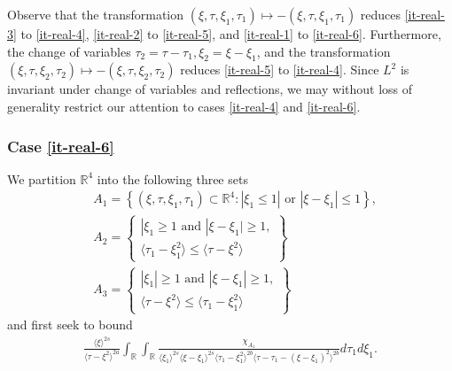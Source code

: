 \documentclass[12pt,reqno]{amsart}
\numberwithin{equation}{section}  %
\numberwithin{figure}{section}
\newcommand{\rr}{\mathbb{R}}
\theoremstyle{plain}
\theoremstyle{definition}
\theoremstyle{remark}
\begin{document}
%
%
Observe that the transformation $(\xi, \tau, \xi_{1}, \tau_{1}) \mapsto -(\xi, \tau,
\xi_{1}, \tau_{1})$ reduces \eqref{it-real-3} to \eqref{it-real-4}, \eqref{it-real-2} to
\eqref{it-real-5}, and \eqref{it-real-1} to \eqref{it-real-6}. Furthermore, the change of
variables $\tau_{2} = \tau - \tau_{1}, \xi_{2} = \xi - \xi_{1}$, and the
transformation $(\xi, \tau, \xi_{2}, \tau_{2}) \mapsto - (\xi, \tau, \xi_{2},
\tau_{2})$ reduces \eqref{it-real-5} to \eqref{it-real-4}. Since $L^{2}$ is invariant
under change of variables and reflections, we may without loss of generality
restrict our attention to cases \eqref{it-real-4} and \eqref{it-real-6}.
 \subsubsection{Case \eqref{it-real-6}} 
\label{sssec:case-it-real-6}
We partition $\rr^{4}$ into the following three sets 
%
%
\begin{equation*}
\begin{split}
  & A_{1} = \left\{ (\xi, \tau, \xi_{1}, \tau_{1}) \subset \rr^{4}: |
  \xi_{1} \le 1 | \text{ or } | \xi - \xi_{1} | \le 1 \right\},
  \\
  & A_{2} = 
  \begin{Bmatrix}
    | \xi_{1} \ge 1 \text{ and } | \xi - \xi_{1} | \ge 1,
    \\
    \langle \tau_{1} - \xi_{1}^{2} \rangle  \le \langle \tau -
  \xi^{2} \rangle
\end{Bmatrix}
  \\
  & A_{3} = 
  \begin{Bmatrix}
    | \xi_{1} | \ge 1 \text{ and } | \xi - \xi_{1} | \ge 1,
    \\
    \langle \tau - \xi^{2} \rangle  \le \langle \tau_{1} - \xi_{1}^{2} \rangle 
  \end{Bmatrix}
\end{split}
\end{equation*}
%
and first seek to bound
%
%
\begin{equation}
  \label{case-1-region-1}
  \begin{split}
    \frac{ \langle \xi
    \rangle ^{2s}}{\langle \tau - \xi^{2} \rangle ^{2a}}
    \int_{\rr} \int_{\rr} \frac{\chi_{A_{1}}}{ \langle \xi_{1} \rangle ^{2s} \langle \xi-\xi_{1} \rangle ^{2s} 
    \langle \tau_{1} - \xi_{1}^{2} \rangle^{2b} \langle  \tau - \tau_{1} -
    (\xi - \xi_{1})^{2} \rangle^{2b} }
    d \tau_1 d \xi_{1}.
  \end{split}
\end{equation}
\end{document}
